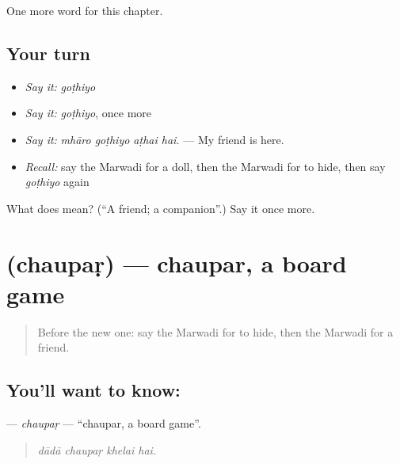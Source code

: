 \begin{grammarlens}[title={What you've built}]
One more word for this chapter.
\end{grammarlens}

\subsection*{Your turn}
\begin{itemize}
\raggedright
  \item \emph{Say it:} \emph{goṭhiyo}
  \item \emph{Say it:} \emph{goṭhiyo}, once more
  \item \emph{Say it:} \emph{mhāro goṭhiyo aṭhai hai.} — My friend is here.
  \item \emph{Recall:} say the Marwadi for a doll, then the Marwadi for to hide, then say \emph{goṭhiyo} again
\end{itemize}

\begin{tcolorbox}[breakable,colback=teal!4,colframe=teal!35!black,title={Before you move on}]
What does  mean? (\textquotedblleft{}A friend; a companion\textquotedblright{}.) Say it once more.
\end{tcolorbox}
\section[\texorpdfstring{\mw{चौपड़} (chaupaṛ)}{चौपड़ (chaupaṛ)}]{ (chaupaṛ) — chaupar, a board game}

\label{lesson:MW-C279-chaupar}



\begin{quote}
Before the new one: say the Marwadi for to hide, then the Marwadi for a friend.
\end{quote}

\subsection*{You'll want to know: }
\textbf{} — \emph{chaupaṛ} — \textquotedblleft{}chaupar, a board game\textquotedblright{}.

\begin{quote}
   
\end{quote}

\begin{quote}
\emph{dādā chaupaṛ khelai hai.}
\end{quote}

